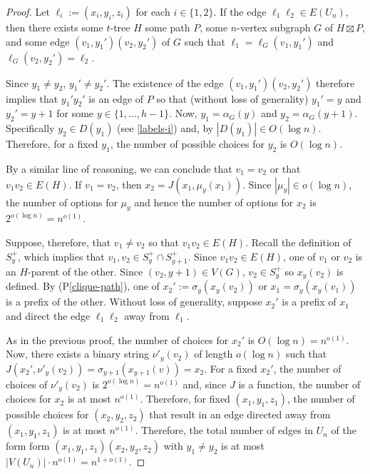 \documentclass{patmorin}
\newcommand{\pref}[1]{(P\ref{#1})}
\begin{document}
\begin{proof}
    Let $\ell_i:=(x_i,y_i,z_i)$ for each $i\in\{1,2\}$.  If the edge $\ell_1\ell_2\in E(U_n)$, then there exists some $t$-tree $H$ some path $P$, some $n$-vertex subgraph $G$ of $H\boxtimes P$, and some edge $(v_1,y_1')(v_2,y_2')$ of $G$ such that $\ell_1=\ell_G(v_1,y_1')$ and $\ell_G(v_2,y_2')=\ell_2$.

    Since $y_1\neq y_2$, $y_1'\neq y_2'$.
    The existence of the edge $(v_1,y_1')(v_2,y_2')$ therefore implies that $y_1'y_2'$ is an edge of $P$ so that (without loss of generality) $y_1'=y$ and $y_2'=y+1$ for some $y\in\{1,\ldots,h-1\}$.  Now, $y_1=\alpha_G(y)$ and $y_2=\alpha_G(y+1)$.  Specifically $y_2\in D(y_1)$ (see \cref{labels-i}) and, by $|D(y_1)|\in O(\log n)$.  Therefore, for a fixed $y_1$, the number of possible choices for $y_2$ is $O(\log n)$.

    By a similar line of reasoning, we can conclude that $v_1=v_2$ or that $v_1v_2\in E(H)$.  If $v_1=v_2$, then $x_2=J(x_1,\mu_y(x_1))$. Since $|\mu_y|\in o(\log n)$, the number of options for $\mu_y$ and hence the number of options for $x_2$ is $2^{o(\log n)}=n^{o(1)}$.

    Suppose, therefore, that $v_1\neq v_2$ so that $v_1v_2\in E(H)$.  Recall the definition of $S^+_y$, which implies that $v_1,v_2\in S^+_y\cap S^+_{y+1}$.  Since $v_1v_2\in E(H)$, one of $v_1$ or $v_2$ is an $H$-parent of the other. Since $(v_2,y+1)\in V(G)$, $v_2\in S^+_y$ so $x_y(v_2)$ is defined. By \pref{clique-path}, one of $x_2':=\sigma_y(x_y(v_2))$ or $x_1=\sigma_y(x_y(v_1))$ is a prefix of the other.  Without loss of generality, suppose $x_2'$ is a prefix of $x_1$ and direct the edge $\ell_1\ell_2$ away from $\ell_1$.

    As in the previous proof, the number of choices for $x_2'$ is $O(\log n)=n^{o(1)}$.
    Now, there exists a binary string $\nu'_y(v_2)$ of length $o(\log n)$ such that $J(x_2',\nu'_y(v_2))=\sigma_{y+1}(x_{y+1}(v))=x_2$.  For a fixed $x_2'$, the number of choices of $\nu'_y(v_2)$ is $2^{o(\log n)}=n^{o(1)}$ and, since $J$ is a function, the number of choices for $x_2$ is at most $n^{o(1)}$.  Therefore, for fixed $(x_1,y_1,z_1)$, the number of possible choices for $(x_2,y_2,z_2)$ that result in an edge directed away from $(x_1,y_1,z_1)$ is at most $n^{o(1)}$.  Therefore, the total number of edges in $U_n$ of the form form $(x_1,y_1,z_1)(x_2,y_2,z_2)$ with $y_1\neq y_2$ is at most $|V(U_n)|\cdot n^{o(1)} = n^{1+o(1)}$.
\end{proof}
\end{document}
